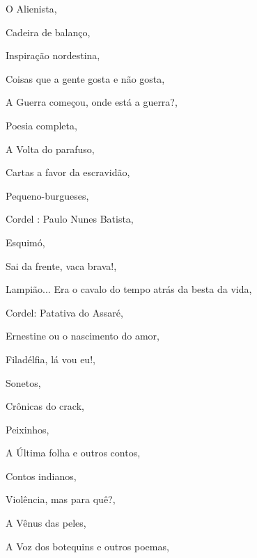 \begin{multicols}{2}
\begin{enumerate}
{\item O Alienista, {}
\item Cadeira de balanço, {}
\item Inspiração nordestina, {}
\item Coisas que a gente gosta e não gosta, {}
\item A Guerra começou, onde está a guerra?, {}
\item Poesia completa, {}
\item A Volta do parafuso, {}
\item Cartas a favor da escravidão, {}
\item Pequeno-burgueses, {}
\item Cordel : Paulo Nunes Batista, {}
\item Esquimó, {}
\item Sai da frente, vaca brava!, {}
\item Lampião... Era o cavalo do tempo atrás da besta da vida, {}
\item Cordel: Patativa do Assaré, {}
\item Ernestine ou o nascimento do amor, {}
\item Filadélfia, lá vou eu!, {}
\item Sonetos, {}
\item Crônicas do crack, {}
\item Peixinhos, {}
\item A Última folha e outros contos, {}
\item Contos indianos, {}
\item Violência, mas para quê?, {}
\item A Vênus das peles, {}
\item A Voz dos botequins e outros poemas, {}
}
\end{enumerate}
\end{multicols}
